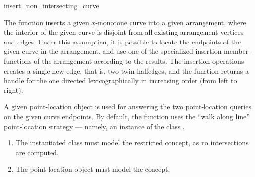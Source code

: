 \ccRefPageBegin

\begin{ccRefFunction}{insert_non_intersecting_curve}

\ccDefinition

The function \ccRefName{} inserts a given $x$-monotone curve into a given
arrangement, where the interior of the given curve is disjoint from all
existing arrangement vertices and edges. Under this assumption, it is
possible to locate the endpoints of the given curve in the arrangement,
and use one of the specialized insertion member-functions of the
arrangement according to the results. The insertion operations creates a
single new edge, that is, two twin halfedges, and the function returns a
handle for the one directed lexicographically in increasing order (from
left to right).

A given point-location object is used for answering the two point-location
queries on the given curve endpoints. By default, the function uses the
``walk along line'' point-location strategy --- namely, an instance of the
class .



\ccRequirements
\begin{enumerate}
\item The instantiated  class must model the restricted
   concept, as no intersections are computed.
\item The point-location object  must model the
   concept. 
\end{enumerate}

\end{ccRefFunction}

\ccRefPageEnd
